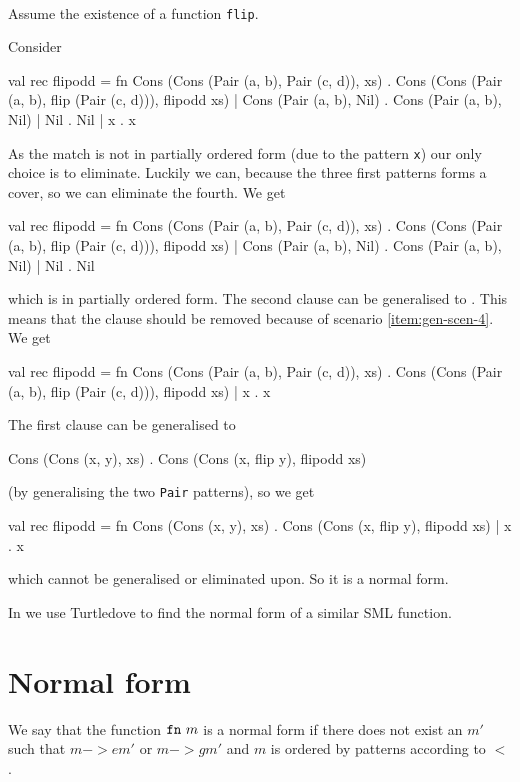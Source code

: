 \begin{example}[Generalisation, $->g$]\ \\
Assume the existence of a function \texttt{flip}.

Consider

\begin{sml}
val rec flipodd =
fn Cons (Cons (Pair (a, b), Pair (c, d)), xs) .
     Cons (Cons (Pair (a, b), flip (Pair (c, d))), flipodd xs)
 | Cons (Pair (a, b), Nil) . Cons (Pair (a, b), Nil)
 | Nil . Nil
 | x . x
\end{sml}

As the match is not in partially ordered form (due to the pattern \texttt{x})
our only choice is to eliminate. Luckily we can, because the three first
patterns forms a cover, so we can eliminate the fourth. We get
\begin{sml}
val rec flipodd =
fn Cons (Cons (Pair (a, b), Pair (c, d)), xs) .
     Cons (Cons (Pair (a, b), flip (Pair (c, d))), flipodd xs)
 | Cons (Pair (a, b), Nil) . Cons (Pair (a, b), Nil)
 | Nil . Nil
\end{sml}
which is in partially ordered form. The second clause can be generalised to
. This means that the clause  should be removed
because of scenario \ref{item:gen-scen-4}. We get
\begin{sml}
val rec flipodd =
fn Cons (Cons (Pair (a, b), Pair (c, d)), xs) .
     Cons (Cons (Pair (a, b), flip (Pair (c, d))), flipodd xs)
 | x . x
\end{sml}
The first clause can be generalised to

\begin{sml}
Cons (Cons (x, y), xs) . Cons (Cons (x, flip y), flipodd xs)
\end{sml}
\noindent (by generalising the two \texttt{Pair} patterns), so we get

\begin{sml}
val rec flipodd =
fn Cons (Cons (x, y), xs) .
     Cons (Cons (x, flip y), flipodd xs)
 | x . x
\end{sml}
which cannot be generalised or eliminated upon. So it is a normal form.

In  we use Turtledove to find the normal
form of a similar SML function.

\end{example}

\section{Normal form}
We say that the function $\texttt{fn}\  m$ is a normal form if there does not exist an
$m'$ such that $m ->e m'$ or $m ->g m'$ and $m$ is ordered by patterns according
to $<$.

